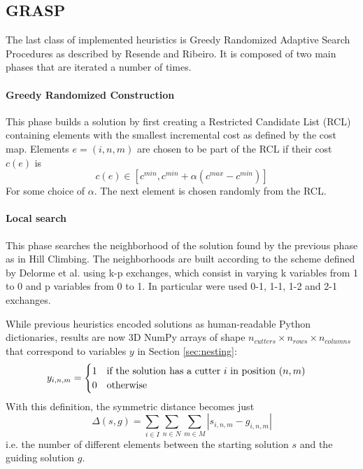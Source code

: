 \subsection{GRASP}
The last class of implemented heuristics is Greedy Randomized Adaptive Search Procedures as described by Resende and Ribeiro\cite{grasp}. It is composed of two main phases that are iterated a number of times.

\paragraph{Greedy Randomized Construction} This phase builds a solution by first creating a Restricted Candidate List (RCL) containing elements with the smallest incremental cost as defined by the cost map. Elements $e = (i, n, m)$ are chosen to be part of the RCL if their cost $c(e)$ is
$$
c(e) \in [c^{min}, c^{min} + \alpha (c^{max} - c^{min})]
$$ 
For some choice of $\alpha$. The next element is chosen randomly from the RCL.

\paragraph{Local search} This phase searches the neighborhood of the solution found by the previous phase as in Hill Climbing. The neighborhoods are built according to the scheme defined by Delorme et al.\cite{local_search} using k-p exchanges, which consist in varying k variables from 1 to 0 and p variables from 0 to 1. In particular were used 0-1, 1-1, 1-2 and 2-1 exchanges.

\vspace{20px}

While previous heuristics encoded solutions as human-readable Python dictionaries, results are now 3D NumPy arrays of shape $n_{cutters} \times n_{rows} \times n_{columns}$ that correspond to variables $y$ in Section \ref{sec:nesting}:
\begin{equation}\notag
	y_{i, n, m} = 
	\begin{cases}
		1 \quad \textrm{if the solution has a cutter } i \textrm{ in position } (n, m) \\
		0 \quad \textrm{otherwise}
	\end{cases}
\end{equation}
With this definition, the symmetric distance becomes just
$$
\Delta(s, g) = \sum_{i \in I}\sum_{n \in N}\sum_{m \in M} |s_{i, n, m} - g_{i, n, m}|
$$
i.e. the number of different elements between the starting solution $s$ and the guiding solution $g$.

